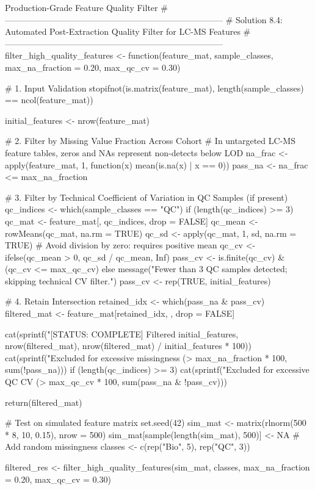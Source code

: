 \documentclass[11pt,twoside,openright]{book}
\begin{document}
\begin{rchunk}{Production-Grade Feature Quality Filter}
# -----------------------------------------------------------------------------
# Solution 8.4: Automated Post-Extraction Quality Filter for LC-MS Features
# -----------------------------------------------------------------------------
filter_high_quality_features <- function(feature_mat, 
                                        sample_classes, 
                                        max_na_fraction = 0.20, 
                                        max_qc_cv = 0.30) {
  # 1. Input Validation
  stopifnot(is.matrix(feature_mat), length(sample_classes) == ncol(feature_mat))
  
  initial_features <- nrow(feature_mat)
  
  # 2. Filter by Missing Value Fraction Across Cohort
  # In untargeted LC-MS feature tables, zeros and NAs represent non-detects below LOD
  na_frac <- apply(feature_mat, 1, function(x) mean(is.na(x) | x == 0))
  pass_na <- na_frac <= max_na_fraction
  
  # 3. Filter by Technical Coefficient of Variation in QC Samples (if present)
  qc_indices <- which(sample_classes == "QC")
  if (length(qc_indices) >= 3) {
    qc_mat <- feature_mat[, qc_indices, drop = FALSE]
    qc_mean <- rowMeans(qc_mat, na.rm = TRUE)
    qc_sd   <- apply(qc_mat, 1, sd, na.rm = TRUE)
    # Avoid division by zero: requires positive mean
    qc_cv   <- ifelse(qc_mean > 0, qc_sd / qc_mean, Inf)
    pass_cv <- is.finite(qc_cv) & (qc_cv <= max_qc_cv)
  } else {
    message("Fewer than 3 QC samples detected; skipping technical CV filter.")
    pass_cv <- rep(TRUE, initial_features)
  }
  
  # 4. Retain Intersection
  retained_idx <- which(pass_na & pass_cv)
  filtered_mat <- feature_mat[retained_idx, , drop = FALSE]
  
  cat(sprintf("[STATUS: COMPLETE] Filtered %
              initial_features, nrow(filtered_mat), nrow(filtered_mat) / initial_features * 100))
  cat(sprintf("Excluded for excessive missingness (> %
              max_na_fraction * 100, sum(!pass_na)))
  if (length(qc_indices) >= 3) {
    cat(sprintf("Excluded for excessive QC CV (> %
                max_qc_cv * 100, sum(pass_na & !pass_cv)))
  }
  
  return(filtered_mat)
}

# Test on simulated feature matrix
set.seed(42)
sim_mat <- matrix(rlnorm(500 * 8, 10, 0.15), nrow = 500)
sim_mat[sample(length(sim_mat), 500)] <- NA # Add random missingness
classes <- c(rep("Bio", 5), rep("QC", 3))

filtered_res <- filter_high_quality_features(sim_mat, classes, max_na_fraction = 0.20, max_qc_cv = 0.30)
\end{rchunk}
\end{document}
